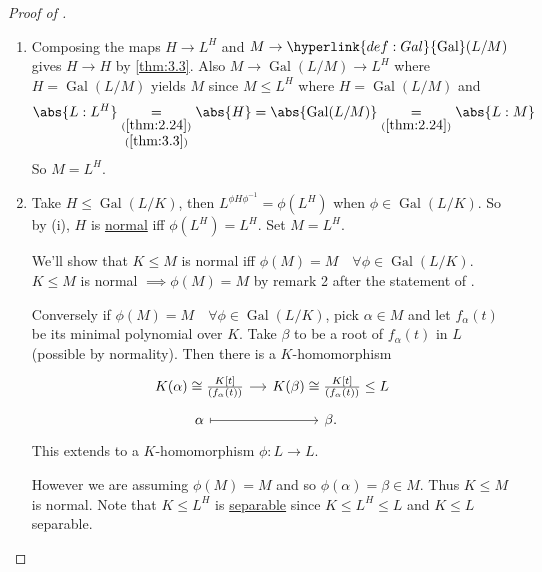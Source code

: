 \documentclass{article}
\DeclareMathOperator{\Gal}{Gal}
\begin{document}
\begin{proof}[Proof of ]
    \leavevmode
    \begin{enumerate}[label=(\roman*)]
        \item Composing the maps $H \to L^H$ and $M \to \hyperlink{def:Gal}{\Gal}(L /M)$ gives $H \to H$ by \cref{thm:3.3}.
            Also $M \longrightarrow \Gal(L/M) \longrightarrow L^H$ where $H = \Gal(L/M)$ yields $M$ since $M \leq L^H$ where $H = \Gal(L/M)$ and
            \begin{equation*}
                \abs{L:L^H} \underset{\begin{subarray}{c}(\ref{thm:2.24})\\(\ref{thm:3.3})\end{subarray}}{=} \abs{H} = \abs{\Gal(L/M)} \underset{(\ref{thm:2.24})}{=} \abs{L:M}
            \end{equation*}
            So $M = L^H$.
        \item Take $H \leq \Gal(L/K)$, then $L^{\phi H \phi^{-1}} = \phi(L^H)$ when $\phi \in \Gal(L/K)$.
            So by (i), $H$ is \hyperlink{def:normal}{normal} iff $\phi(L^H) = L^H$. Set $M = L^H$.

            We'll show that $K \leq M$ is normal iff $\phi(M) = M \quad \forall \phi \in \Gal(L/K)$.
            $K \leq M$ is normal $\implies \phi(M) = M$ by remark 2 after the statement of .

            Conversely if $\phi(M) = M \quad \forall \phi \in \Gal(L/K)$, pick $\alpha \in M$ and let $f_\alpha(t)$ be its minimal polynomial over $K$.
            Take $\beta$ to be a root of $f_\alpha(t)$ in $L$ (possible by normality).
            Then there is a $K$-homomorphism
            \begin{equation*}
                \begin{tikzcd}[row sep=tiny, column sep=small]
                    K(\alpha) \cong \frac{K[t]}{(f_\alpha(t))} \ar[r] & K(\beta) \cong \frac{K[t]}{(f_\alpha(t))} \leq L \\
                    \alpha \ar[r, mapsto] & \beta.
                \end{tikzcd}
            \end{equation*}
            This extends to a $K$-homomorphism $\phi:L \to L$.

            However we are assuming $\phi(M) = M$ and so $\phi(\alpha) = \beta \in M$. Thus $K \leq M$ is normal.
            Note that $K \leq L^H$ is \hyperlink{def:separableExt}{separable} since $K \leq L^H \leq L$ and $K \leq L$ separable.


\end{enumerate}
\end{proof}
\end{document}

